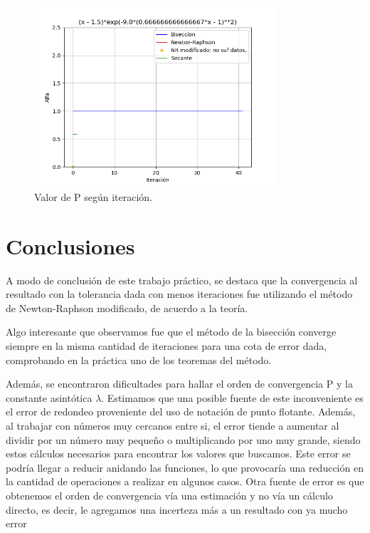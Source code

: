 \documentclass[titlepage,a4paper]{article}
\begin{document}
\begin{figure}[H]
    \centering
    \includegraphics[width=0.8\textwidth]{alfa f3.png}
    \caption{\label{fig:alfaf3}Valor de P según iteración.}
\end{figure}


\newpage

\section{Conclusiones}\label{sec:conclusiones} %

A modo de conclusión de este trabajo práctico, se destaca que la convergencia al resultado con la tolerancia dada con menos iteraciones fue utilizando el método de Newton-Raphson modificado, de acuerdo a la teoría. 

Algo interesante que observamos fue que el método de la bisección converge siempre en la misma cantidad de iteraciones para una cota de error dada, comprobando en la práctica uno de los teoremas del método.

Además, se encontraron dificultades para hallar el orden de convergencia P y la constante asintótica $\lambda$. Estimamos que una posible fuente de este inconveniente es el error de redondeo proveniente del uso de notación de punto flotante. Además, al trabajar con números muy cercanos entre si, el error tiende a aumentar al dividir por un número muy pequeño o multiplicando por uno muy grande, siendo estos cálculos necesarios para encontrar los valores que buscamos. Este error se podría llegar a reducir anidando las funciones, lo que provocaría una reducción en la cantidad de operaciones a realizar en algunos casos. 
Otra fuente de error es que obtenemos el orden de convergencia vía una estimación y no vía un cálculo directo, es decir, le agregamos una incerteza más a un resultado con ya mucho error
 
\end{document}
